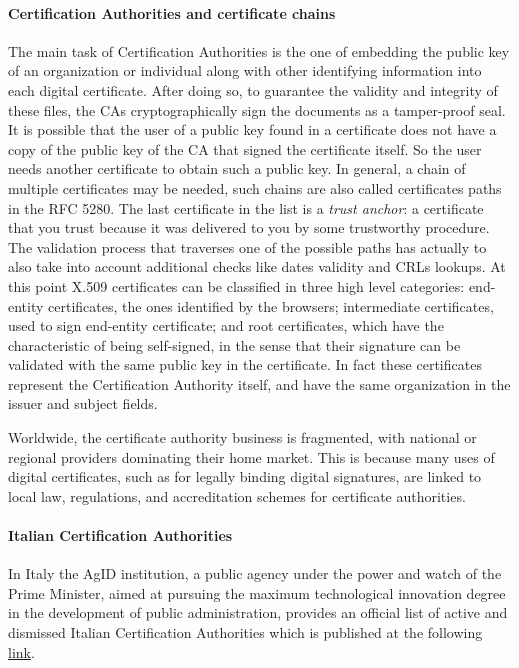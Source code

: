 \documentclass[11pt]{article}
\begin{document}
\paragraph*{Certification Authorities and certificate chains}
The main task of Certification Authorities is the one of embedding the public key of an organization or individual along with other identifying information into each digital certificate. After doing so, to guarantee the validity and integrity of these files, the CAs cryptographically sign the documents as a tamper-proof seal. It is possible that the user of a public key found in a certificate does not have a copy of the public key of the CA that signed the certificate itself. So the user needs another certificate to obtain such a public key. In general, a chain of multiple certificates may be needed, such chains are also called certificates paths in the RFC 5280\cite{rfc5280 }. The last certificate in the list is a \textit{trust anchor}: a certificate that you trust because it was delivered to you by some trustworthy procedure. The validation process that traverses one of the possible paths has actually to also take into account additional checks like dates validity and CRLs lookups. At this point X.509 certificates can be classified in three high level categories: end-entity certificates, the ones identified by the browsers; intermediate certificates, used to sign end-entity certificate; and root certificates, which have the characteristic of being self-signed, in the sense that their signature can be validated with the same public key in the certificate. In fact these certificates represent the Certification Authority itself, and have the same organization in the issuer and subject fields.

Worldwide, the certificate authority business is fragmented, with national or regional providers dominating their home market. This is because many uses of digital certificates, such as for legally binding digital signatures, are linked to local law, regulations, and accreditation schemes for certificate authorities.

\paragraph*{Italian Certification Authorities}
In Italy the AgID institution, a public agency under the power and watch of the Prime Minister, aimed at pursuing the maximum technological innovation degree in the development of public administration, provides an official list of active and dismissed Italian Certification Authorities which is published at the following \href{http://www.agid.gov.it/identita-digitali/firme-elettroniche/certificatori-attivi}{link}.
\end{document}
